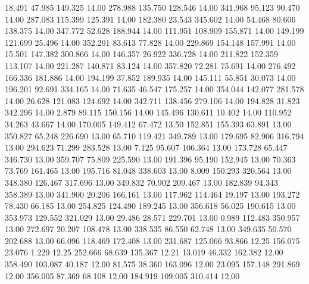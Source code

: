   18.491   47.985  149.325        14.00
 278.988  135.750  128.546        14.00
 341.968   95.123   90.470        14.00
 287.083  115.399  125.391        14.00
 182.380   23.543  345.602        14.00
  54.468   80.606  138.375        14.00
 347.772   52.628  188.944        14.00
 111.951  108.909  155.871        14.00
 149.199  121.699   25.496        14.00
 352.201   83.613   77.828        14.00
 229.869  154.148  157.991        14.00
  15.501  147.382  300.866        14.00
 146.357   26.922  336.728        14.00
 211.822  152.359  113.107        14.00
 221.287  140.871   83.124        14.00
 357.820   72.281   75.691        14.00
 276.492  166.336  181.886        14.00
 194.199   37.852  189.935        14.00
 145.111   55.851   30.073        14.00
 196.201   92.691  334.165        14.00
  71.635   46.547  175.257        14.00
 354.044  142.077  281.578        14.00
  26.628  121.083  124.692        14.00
 342.711  138.456  279.106        14.00
 194.828   31.823  342.296        14.00
   2.879   89.115  150.156        14.00
 145.496  130.611   10.402        14.00
 110.952   34.263   43.667        14.00
 170.005  149.412   67.472        13.50
 152.851  155.393   63.891        13.00
 350.827   65.248  226.690        13.00
  65.710  119.421  349.789        13.00
 179.695   82.906  316.794        13.00
 294.623   71.299  283.528        13.00
   7.125   95.607  106.364        13.00
 173.728   65.447  346.730        13.00
 359.707   75.809  225.590        13.00
 191.396   95.190  152.945        13.00
  70.363   73.769  161.465        13.00
 195.716   81.048  338.603        13.00
   8.009  150.293  320.564        13.00
 348.380  126.467  317.696        13.00
 349.832   70.902  209.467        13.00
 182.839   94.343  358.389        13.00
 341.900   20.206  166.161        13.00
 117.962  114.464   19.197        13.00
 193.272   78.430   66.185        13.00
 254.825  124.490  189.245        13.00
 356.618   56.025  190.615        13.00
 353.973  129.552  321.029        13.00
  29.486   28.571  229.701        13.00
   0.989  112.483  350.957        13.00
 272.697   20.207  108.478        13.00
 338.535   86.550   62.748        13.00
 349.635   50.570  202.688        13.00
  66.096  118.469  172.408        13.00
 231.687  125.066   93.866        12.25
 156.075   23.076    1.229        12.25
 252.666   68.639  135.367        12.21
  13.019   46.332  162.382        12.00
 358.490  103.087   40.187        12.00
  81.575   38.360  163.096        12.00
  23.095  157.148  291.869        12.00
 356.005   87.369   68.108        12.00
 184.919  109.005  310.414        12.00
